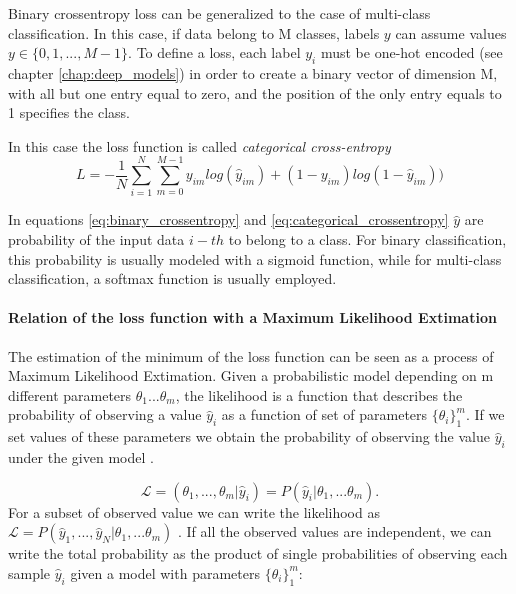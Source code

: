 \documentclass[11pt]{report}
\begin{document}
Binary crossentropy loss can be generalized to the case of multi-class classification.
In this case, if data belong to M classes, labels $y$ can assume values $y \in \{0, 1, ..., M-1\}$.
To define a loss, each label $y_i$ must be one-hot encoded (see chapter \ref{chap:deep_models}) in order to create a binary vector of dimension M, with all but one entry equal to zero, and the position of the only entry equals to 1 specifies the class.

In this case the loss function is called \emph{categorical cross-entropy}
\begin{equation}\label{eq:categorical_crossentropy}
L = -\frac{1}{N} \sum_{i=1}^N \sum_{m=0}^{M-1}y_{im} log(\hat y_{im}) + (1-y_{im})log(1- \hat y_{im}))
\end{equation}

In equations \ref{eq:binary_crossentropy} and \ref{eq:categorical_crossentropy} $\hat y$ are probability of the input data $i-th$ to belong to a class.
For binary classification, this probability is usually modeled with a sigmoid function, while for multi-class classification, a softmax function is usually employed.

\paragraph{Relation of the loss function with a Maximum Likelihood Extimation}
\hfill

\noindent The estimation of the minimum of the loss function can be seen as a process of Maximum Likelihood Extimation.
Given a probabilistic model depending on m different parameters $\theta_1 ... \theta_m$, the likelihood is a function that describes the probability of observing a value $\hat y_i$ as a function of set of parameters $\{\theta_i \}_1 ^m$.
If we set values of these parameters we obtain the probability of observing the value $\hat y_i$ under the given model \cite{baldini2021}.

\begin{equation}
 \mathcal{L} = (\theta_1, ..., \theta_m | \hat y_i) = P(\hat y_i|\theta_1, ...\theta_m).
\end{equation}
For a subset of observed value we can write the likelihood as $\mathcal{L} = P(\hat y_1, ..., \hat y_N | \theta_1, ...\theta_m)$ .
If all the observed values are independent, we can write the total probability as the product of single probabilities of observing each sample $\hat y_i$ given a model with parameters $\{\theta_i \}_1 ^m$:
\end{document}
